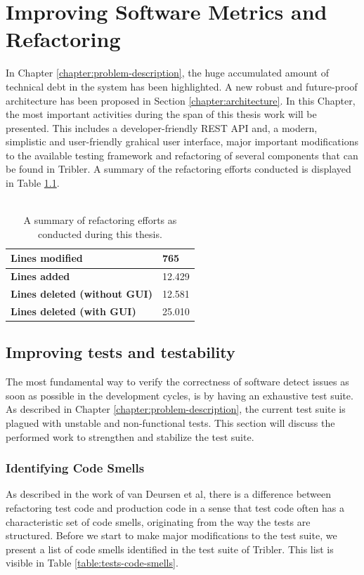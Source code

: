 \chapter{Improving Software Metrics and Refactoring}
\label{chapter:refactoring}
In Chapter \ref{chapter:problem-description}, the huge accumulated amount of technical debt in the system has been highlighted. A new robust and future-proof architecture has been proposed in Section \ref{chapter:architecture}. In this Chapter, the most important activities during the span of this thesis work will be presented. This includes a developer-friendly REST API and, a modern, simplistic and user-friendly grahical user interface, major important modifications to the available testing framework and refactoring of several components that can be found in Tribler. A summary of the refactoring efforts conducted is displayed in Table \ref{table:refactoring-summary}.\\\\

\begin{table}[h!]
	\centering
	\begin{tabular}{|l|l|}
		\hline
		\textbf{Lines modified} & 765 \\ \hline
		\textbf{Lines added} & 12.429 \\ \hline
		\textbf{Lines deleted (without GUI)} & 12.581 \\ \hline
		\textbf{Lines deleted (with GUI)} & 25.010 \\ \hline
	\end{tabular}
	\label{table:refactoring-summary}
	\caption{A summary of refactoring efforts as conducted during this thesis.}
\end{table}

\section{Improving tests and testability}
The most fundamental way to verify the correctness of software detect issues as soon as possible in the development cycles, is by having an exhaustive test suite. As described in Chapter \ref{chapter:problem-description}, the current test suite is plagued with unstable and non-functional tests. This section will discuss the performed work to strengthen and stabilize the test suite.

\subsection{Identifying Code Smells}
As described in the work of van Deursen et al\cite{van2001refactoring}, there is a difference between refactoring test code and production code in a sense that test code often has a characteristic set of code smells, originating from the way the tests are structured. Before we start to make major modifications to the test suite, we present a list of code smells identified in the test suite of Tribler. This list is visible in Table \ref{table:tests-code-smells}.

